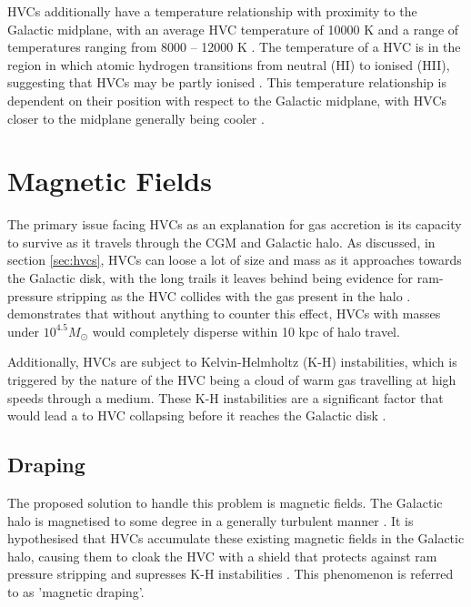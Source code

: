 HVCs additionally have a temperature relationship with proximity to the Galactic midplane, with an average HVC temperature of 10000 K and a range of temperatures ranging from 8000 – 12000 K \citep{ID49, ID48}. The temperature of a HVC is in the region in which atomic hydrogen transitions from neutral (HI) to ionised (HII), suggesting that HVCs may be partly ionised \citep{ID49, ID48, ID68}. This temperature relationship is dependent on their position with respect to the Galactic midplane, with HVCs closer to the midplane generally being cooler \citep{ID48}.

\section{Magnetic Fields}
\label{sec:bfields}

The primary issue facing HVCs as an explanation for gas accretion is its capacity to survive as it travels through the CGM and Galactic halo. As discussed, in section \ref{sec:hvcs}, HVCs can loose a lot of size and mass as it approaches towards the Galactic disk, with the long trails it leaves behind being evidence for ram-pressure stripping as the HVC collides with the gas present in the halo \citep{ID11, ID23, ID33}. \cite{ID25} demonstrates that without anything to counter this effect, HVCs with masses under $10^{4.5} M_{\odot}$ would completely disperse within 10 kpc of halo travel.


Additionally, HVCs are subject to Kelvin-Helmholtz (K-H) instabilities, which is triggered by the nature of the HVC being a cloud of warm gas travelling at high speeds through a medium. These K-H instabilities are a significant factor that would lead a to HVC collapsing before it reaches the Galactic disk \citep{ID11, ID23, ID33}.


\subsection{Draping}
\label{ssec:draping}

The proposed solution to handle this problem is magnetic fields. The Galactic halo is magnetised to some degree in a generally turbulent manner \citep{ID30, ID16, ID4, ID42}. It is hypothesised that HVCs accumulate these existing magnetic fields in the Galactic halo, causing them to cloak the HVC with a shield that protects against ram pressure stripping and supresses K-H instabilities \citep{ID10, ID11, ID13, ID23, ID24, ID34}. This phenomenon is referred to as 'magnetic draping'.


